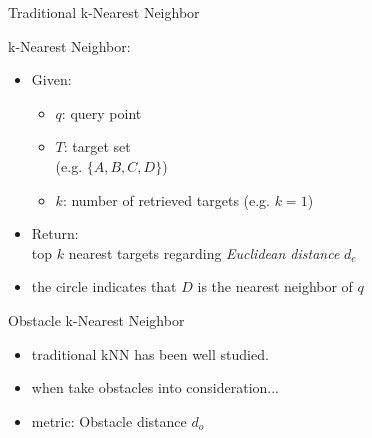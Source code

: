 \begin{frame}{Traditional k-Nearest Neighbor}
\begin{minipage}{.5\textwidth}
\small k-Nearest Neighbor:
\begin{itemize}
    \item<1-> \small Given:
    \begin{itemize}
        \item<2-> \small $q$: query point
        \item<3-> \small $T$: target set\\\tiny(e.g. $\{A,B,C,D\}$)
        \item<4-> \small $k$: number of retrieved targets \tiny(e.g. $k=1$)
    \end{itemize}
    \item<5-> \small Return:\\top $k$ nearest targets regarding \textit{Euclidean distance} $d_e$
    \item<6-> \small the circle indicates that $D$ is the nearest neighbor of $q$
\end{itemize}
\end{minipage}%
\begin{minipage}{.5\textwidth}
\begin{adjustbox}{max totalsize={.9\textwidth}{.9\textheight}, right}

\end{adjustbox}
\end{minipage}
\end{frame}

\begin{frame}{Obstacle k-Nearest Neighbor}
\begin{minipage}{.5\textwidth}
\begin{itemize}
    \item \small traditional kNN has been well studied.
    \item \small when take obstacles into consideration...
    \item \small metric: Obstacle distance $d_o$
\end{itemize}
\end{minipage}%
\begin{minipage}{.5\textwidth}
\begin{adjustbox}{max totalsize={.9\textwidth}{.9\textheight}, right}
 {}
 {}
\end{adjustbox}
\end{minipage}
\end{frame}

